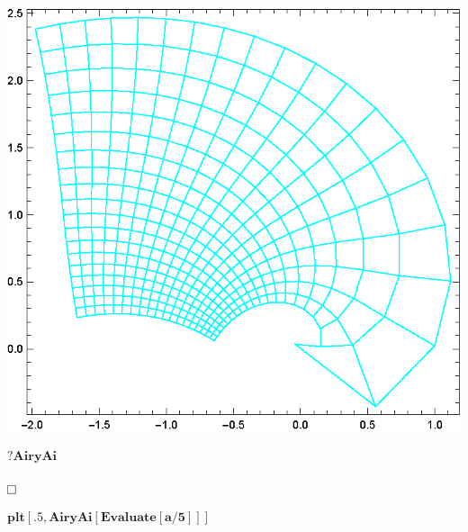 \documentclass{article}
\begin{document}
\includegraphics{functions_on_complex-plane_gr12.eps}

\begin{doublespace}
\noindent\(\pmb{?\text{AiryAi}}\)
\end{doublespace}

\begin{doublespace}
\noindent\(\fbox{$$}\)
\end{doublespace}

\begin{doublespace}
\noindent\(\pmb{\text{plt}[.5,\text{AiryAi}[\text{Evaluate}[a/5]]]}\)
\end{doublespace}
\end{document}
